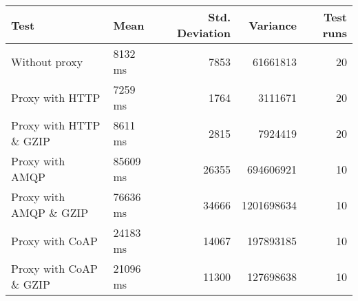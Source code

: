 \begin{tabular}{llrrr}
\hline
 Test                   & Mean     &   Std. Deviation &   Variance &   Test runs \\
\hline
 Without proxy          & 8132 ms  &             7853 &   61661813 &          20 \\
 Proxy with HTTP        & 7259 ms  &             1764 &    3111671 &          20 \\
 Proxy with HTTP \& GZIP & 8611 ms  &             2815 &    7924419 &          20 \\
 Proxy with AMQP        & 85609 ms &            26355 &  694606921 &          10 \\
 Proxy with AMQP \& GZIP & 76636 ms &            34666 & 1201698634 &          10 \\
 Proxy with CoAP        & 24183 ms &            14067 &  197893185 &          10 \\
 Proxy with CoAP \& GZIP & 21096 ms &            11300 &  127698638 &          10 \\
\hline
\end{tabular}